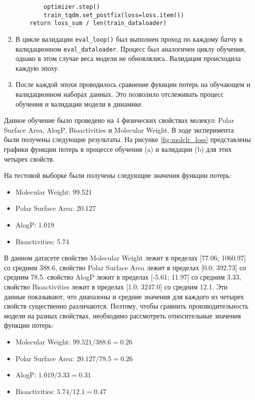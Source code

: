 \begin{enumerate}
\begin{lstlisting}
        optimizer.step()
        train_tqdm.set_postfix(loss=loss.item())
    return loss_sum / len(train_dataloader)
\end{lstlisting}
\item В цикле валидации \texttt{eval\_loop()} был выполнен проход по каждому батчу в валидационном \texttt{eval\_dataloader}. Процесс был аналогичен циклу обучения, однако в этом случае веса модели не обновлялись. Валидация происходила каждую эпоху.

\item После каждой эпохи проводилось сравнение фукнции потерь на обучающем и валидационном наборах данных. Это позволило отслеживать процесс обучения и валидации модели в динамике.
\end{enumerate}


Данное обучение было проведено на 4 физических свойствах молекул: Polar Surface Area, AlogP, Bioactivities и Molecular Weight. В ходе эксперимента были получены следующие результаты. На рисунке \ref{fig:molclr_loss} представлены графики функции потерь в процессе обучения (a) и валидации (b) для этих четырех свойств.

На тестовой выборке были получены следующие значения функции потерь:

\begin{itemize}
\item Molecular Weight: 99.521
\item Polar Surface Area: 20.127
\item AlogP: 1.019
\item Bioactivities: 5.74
\end{itemize}

В данном датасете свойство Molecular Weight лежит в пределах [77.06; 1060.97] со средним 388.6, свойство Polar Surface Area лежит в пределах [0.0; 392.73] со средним 78.5. свойство AlogP лежит в пределах [-5.61; 11.97] со средним 3.33, свойство Bioactivities лежит в пределах [1.0; 3247.0] со средним 12.1. Эти данные показывают, что диапазоны и средние значения для каждого из четырех свойств существенно различаются. Поэтому, чтобы сравнить производительность модели на разных свойствах, необходимо рассмотреть относительные значения функции потерь:
\begin{itemize}
\item Molecular Weight: $99.521 / 388.6 = 0.26$
\item Polar Surface Area: $20.127 / 78.5 = 0.26$
\item AlogP: $1.019 / 3.33 = 0.31$
\item Bioactivities: $5.74 / 12.1 = 0.47$
\end{itemize}

